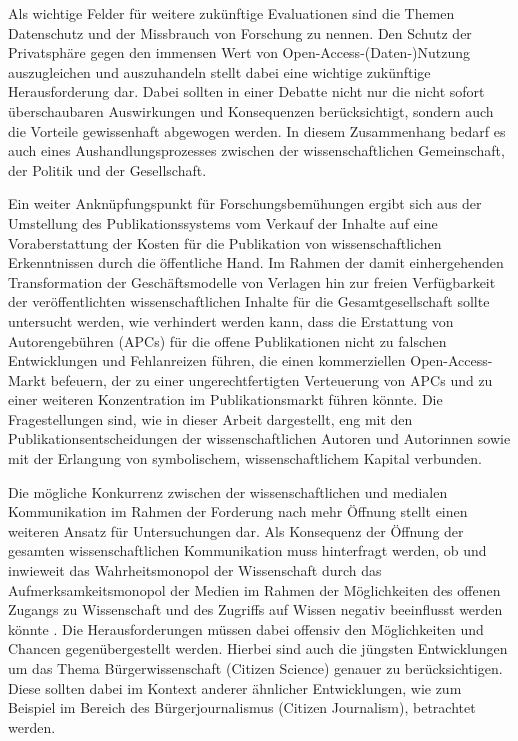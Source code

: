 Als wichtige Felder für weitere zukünftige Evaluationen sind die Themen Datenschutz und der Missbrauch von Forschung \cite{Fritsch_2015} zu nennen. Den Schutz der Privatsphäre gegen den immensen Wert von Open-Access-(Daten-)Nutzung auszugleichen und auszuhandeln stellt dabei eine wichtige zukünftige Herausforderung dar. Dabei sollten in einer Debatte nicht nur die nicht sofort überschaubaren Auswirkungen und Konsequenzen berücksichtigt, sondern auch die Vorteile gewissenhaft abgewogen werden. In diesem Zusammenhang bedarf es auch eines Aushandlungsprozesses zwischen der wissenschaftlichen Gemeinschaft, der Politik und der Gesellschaft.

Ein weiter Anknüpfungspunkt für Forschungsbemühungen ergibt sich aus der Umstellung des Publikationssystems vom Verkauf der Inhalte auf eine Voraberstattung der Kosten für die Publikation von wissenschaftlichen Erkenntnissen durch die öffentliche Hand. Im Rahmen der damit einhergehenden Transformation der Geschäftsmodelle von Verlagen hin zur freien Verfügbarkeit der veröffentlichten wissenschaftlichen Inhalte für die Gesamtgesellschaft sollte untersucht werden, wie verhindert werden kann, dass die Erstattung von Autorengebühren (APCs) für die offene Publikationen nicht zu falschen Entwicklungen und Fehlanreizen führen, die einen kommerziellen Open-Access-Markt befeuern, der zu einer ungerechtfertigten Verteuerung von APCs und zu einer weiteren Konzentration im Publikationsmarkt führen könnte. Die Fragestellungen sind, wie in dieser Arbeit dargestellt, eng mit den Publikationsentscheidungen der wissenschaftlichen Autoren und Autorinnen sowie mit der Erlangung von symbolischem, wissenschaftlichem Kapital verbunden.

Die mögliche Konkurrenz zwischen der wissenschaftlichen und medialen Kommunikation im Rahmen der Forderung nach mehr Öffnung stellt einen weiteren Ansatz für Untersuchungen dar. Als Konsequenz der Öffnung der gesamten wissenschaftlichen Kommunikation muss hinterfragt werden, ob und inwieweit das Wahrheitsmonopol der Wissenschaft durch das Aufmerksamkeitsmonopol der Medien im Rahmen der Möglichkeiten des offenen Zugangs zu Wissenschaft und des Zugriffs auf Wissen negativ beeinflusst werden könnte \cite{Weingart_2005}. Die Herausforderungen müssen dabei offensiv den Möglichkeiten und Chancen gegenübergestellt werden. Hierbei sind auch die jüngsten Entwicklungen um das Thema Bürgerwissenschaft (Citizen Science) genauer zu berücksichtigen. Diese sollten dabei im Kontext anderer ähnlicher Entwicklungen, wie zum Beispiel im Bereich des Bürgerjournalismus (Citizen Journalism), betrachtet werden.

